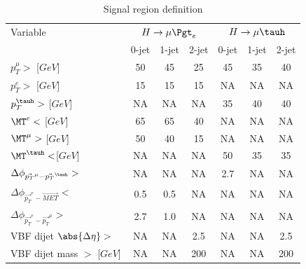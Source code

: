 \begin{table}[hbtp]
 \centering
 \caption{Signal region definition}
  \label{tab:kinematicselection}
   \begin{tabular}{lccc|ccc} \hline
Variable &\multicolumn{3}{c|}{$H\rightarrow\mu\Pgt_{e}$ }                 &     \multicolumn{3}{c}{$H \rightarrow \mu \tauh$}
 \\ \cline{2-7}
                                         &  0-jet        & 1-jet       & 2-jet         &  0-jet         & 1-jet       & 2-jet  \\ \hline
$p_{T}^{\mu}>$ [$GeV$]                                      &     50        &   45        &   25          &  45            & 35          &  40    \\
$p_{T}^{e}>$ [$GeV$]                                      &     15        &   15        &   15          &   NA          &  NA        &  NA      \\
$p_{T}^{\tauh}>$ [$GeV$]                                    &     NA       &    NA      &    NA        &  35            & 40          &  40    \\
$\MT^{e}<$ [$GeV$]                                      &     65        &   65        &   40          &    NA         &   NA       &  NA      \\
$\MT^{\mu}>$ [$GeV$]                                     &    50         &   40        &   15          &    NA         &   NA       &  NA      \\
$\MT^{\tauh}<$[$GeV$]                                     &     NA       &    NA      &    NA        &  50            & 35          &   35   \\   \hline
$\Delta \phi_{\vec{p_{T}}^{\mu}-\vec{p_{T}}^{\tauh}}>$      &     NA       &    NA      &    NA        &  2.7           &  NA        &  NA      \\
$\Delta \phi_{\vec{p_{T}}^{e}-\vec{MET}}<$             &    0.5        &   0.5       &   NA         &    NA         &  NA        &  NA      \\
$\Delta \phi_{\vec{p_{T}}^{e}-\vec{p_{T}}^{\mu}}>$        &    2.7       &   1.0       &    NA        &    NA         &   NA       &  NA      \\  \hline
VBF dijet $\abs{\Delta \eta} > $                      &    NA        &    NA      &   2.5         &  NA           &   NA       &  2.5     \\
VBF dijet mass $>$ [$GeV$]                                     &    NA        &    NA      &   200         &  NA           &   NA       &  200     \\ \hline
  \end{tabular}
\end{table}


